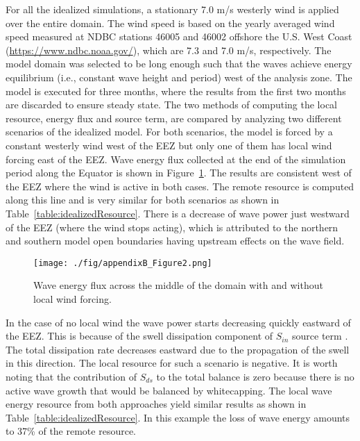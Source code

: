 For all the idealized simulations, a stationary 7.0 m/s westerly wind is applied over the entire domain. The wind speed is based on the yearly averaged wind speed measured at NDBC stations 46005 and 46002 offshore the U.S. West Coast (\url{https://www.ndbc.noaa.gov/}), which are 7.3 and 7.0 m/s, respectively. The model domain was selected to be long enough such that the waves achieve energy equilibrium (i.e., constant wave height and period) west of the analysis zone. The model is executed for three months, where the results from the first two months are discarded to ensure steady state. The two methods of computing the local resource, energy flux and source term, are compared by analyzing two different scenarios of the idealized model. For both scenarios, the model is forced by a constant westerly wind west of the EEZ but only one of them has local wind forcing east of the EEZ. Wave energy flux collected at the end of the simulation period along the Equator is shown in Figure~\ref{fig:idealizedOWP}. The results are consistent west of the EEZ where the wind is active in both cases. The remote resource is computed along this line and is very similar for both scenarios as shown in Table~\ref{table:idealizedResource}. There is a decrease of wave power just westward of the EEZ (where the wind stops acting), which is attributed to the northern and southern model open boundaries having upstream effects on the wave field.

\begin{figure}[ht]
  \centering
  \texttt{[image: ./fig/appendixB\_Figure2.png]}
  \caption{Wave energy flux across the middle of the domain with and without local wind forcing.}
  \label{fig:idealizedOWP}
\end{figure}

In the case of no local wind the wave power starts decreasing quickly eastward of the EEZ. This is because of the swell dissipation component of $S_{in}$ source term \citep{ardhuinObservationSwellDissipation2009}. The total dissipation rate decreases eastward due to the propagation of the swell in this direction. The local resource for such a scenario is negative. It is worth noting that the contribution of $S_{ds}$ to the total balance is zero because there is no active wave growth that would be balanced by whitecapping. The local wave energy resource from both approaches yield similar results as shown in Table~\ref{table:idealizedResource}. In this example the loss of wave energy amounts to 37\% of the remote resource. 

